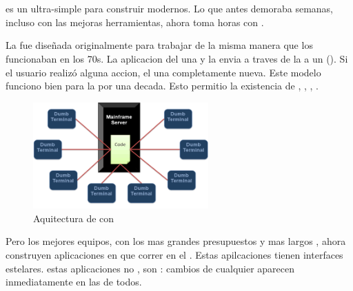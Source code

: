 
\chapter{\meteor}\label{cap:chapter_meteor}


\meteor es un \environment ultra-simple para construir \websites modernos. Lo que antes demoraba semanas, incluso con las mejoras herramientas, ahora toma horas con \meteor.

La \web fue diseñada originalmente para trabajar de la misma manera que los \mainframes funcionaban en los 70s. La aplicacion del \server \rendered una \screen y la envia a traves de la \network a un \dumbterminal (). Si el usuario realizó alguna accion, el \server \rendered una \screen completamente nueva. Este modelo funciono bien para la \web por una decada. Esto permitio la existencia de \lamp, \rails, \django, \php.

\begin{figure}[h!]
	\centering
	\includegraphics[width=0.6\textwidth]{figuras/mainframeServer_dumbterminal.png}
	\caption{Aquitectura de \mainframe con \dumbterminal}
	\label{figure:mainframeServer_dumbterminal}
\end{figure}


Pero los mejores equipos, con los mas grandes presupuestos y mas largos \schedules, ahora construyen aplicaciones en \javascript que correr en el \client. Estas apilcaciones tienen interfaces estelares. estas aplicaciones no \reload \pages, son \reactive: cambios de cualquier \client aparecen inmediatamente en las \screen de todos.

